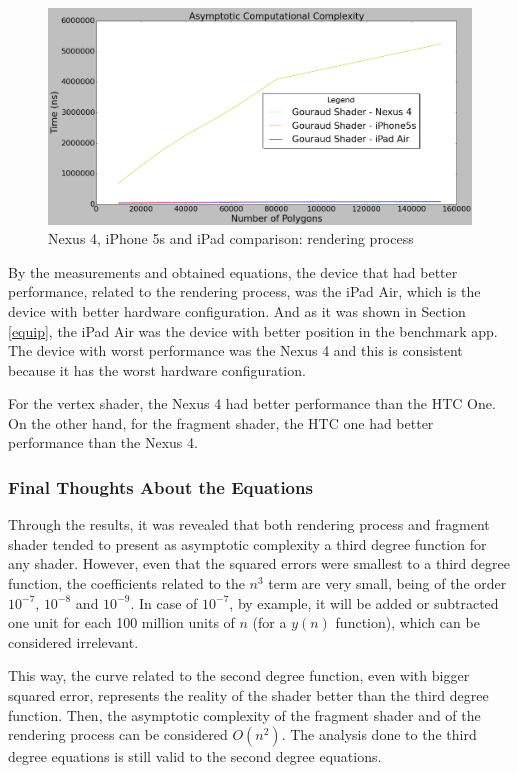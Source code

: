 \documentclass[10pt, conference, compsocconf]{IEEEtran}
\begin{document}
{	\begin{figure}[!t]
	\centering
		\includegraphics[keepaspectratio=true,scale=0.25]{render_time_devices.png}
	\caption{Nexus 4, iPhone 5s and iPad comparison: rendering process}
	\label{nexus_ios}
	\end{figure}	

 By the measurements and obtained equations, the device that had better
performance, related to the rendering process, was the iPad Air, which is
the device with better hardware configuration. And as it was shown in 
Section \ref{equip}, the iPad Air was the device with better position in 
the benchmark app. The device with worst performance was the Nexus 4 and 
this is consistent because it has the worst hardware configuration.

For the vertex shader, the Nexus 4 had better performance than the HTC One.
On the other hand, for the fragment shader, the HTC one had better performance
than the Nexus 4.

\subsubsection{Final Thoughts About the Equations}

Through the results, it was revealed that both rendering process and fragment
shader tended to present as asymptotic complexity a third degree function
for any shader. However, even that the squared errors were smallest to a third degree function,
the coefficients related to the $n^3$ term are very small, being of the 
order $10^{-7}$, $10^{-8}$ and $10^{-9}$. In case of $10^{-7}$, by example, it will be added or subtracted one unit
for each 100 million units of $n$ (for a $y(n)$ function), 
which can be considered irrelevant.

 This way, the curve related to the second degree function, even with 
bigger squared error, represents the reality of the shader better than the
third degree function. Then, the asymptotic complexity of the fragment 
shader and of the rendering process can be considered $O(n^2)$. The analysis done to the third degree 
equations is still valid to the second degree equations.

}
\end{document}

